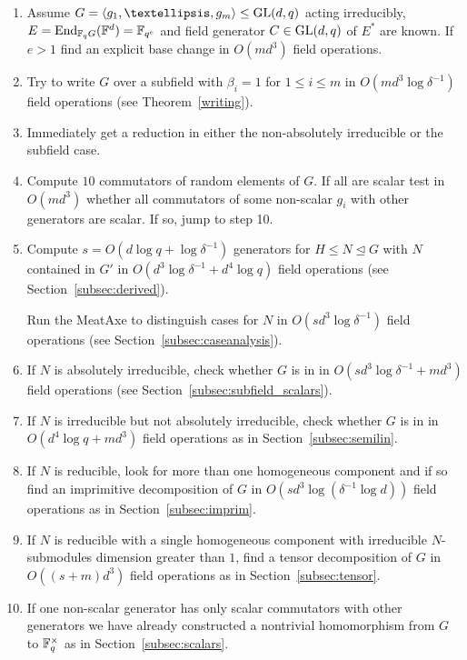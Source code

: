 \begin{enumerate}
\item Assume $G = \left< g_1, \ldots, g_m \right> \le \GL(d,q)$ acting
irreducibly, $E = \End_{\F_q G}(\F^d) = \F_{q^e}$ and
field generator $C \in \GL(d,q)$ of $E^\ast$ are known. If $e > 1$ find an explicit
base change in $O(md^3)$ field operations.
\item Try to write $G$ over a subfield with $\beta_i = 1$ for $1 \leq i \leq m$ 
in $O(md^3\log \delta^{-1})$ field operations
(see Theorem~\ref{writing}).
\item Immediately get a reduction in either the non-absolutely irreducible
or the subfield case.
\item Compute $10$ commutators of random elements of $G$. If all are
scalar test in $O(md^3)$ whether all commutators of some non-scalar
$g_i$ with other generators are scalar. If so, jump to step 10.
\item Compute $s = O(d\log q + \log \delta^{-1})$ generators for 
    $H \le N \unlhd G$ with $N$ contained in $G'$ in 
    $O(d^3\log \delta^{-1} + d^4 \log q)$ field operations
    (see Section~\ref{subsec:derived}). 

Run the MeatAxe to distinguish cases for $N$ in 
$O(sd^3 \log \delta^{-1})$ field operations
(see Section~\ref{subsec:caseanalysis}).
\item If $N$ is absolutely irreducible, check whether $G$ is in 
in $O(sd^3\log \delta^{-1} + md^3)$ field operations
(see Section~\ref{subsec:subfield_scalars}).
\item If $N$ is irreducible but not absolutely irreducible, check
whether $G$ is in  in $O(d^4\log q +m d^3)$ field operations
    as in Section~\ref{subsec:semilin}.
\item If $N$ is reducible, look for more than one 
homogeneous component and if so find an imprimitive 
decomposition of $G$ in $O(sd^3\log( \delta^{-1} \log d))$ field operations as in
Section~\ref{subsec:imprim}.
\item If $N$ is reducible with a single 
homogeneous component with irreducible $N$-submodules 
dimension greater than $1$, find a tensor
decomposition of $G$ in $O((s+m)d^3)$ field operations as in 
Section~\ref{subsec:tensor}.
\item If one non-scalar 
generator has only scalar commutators with other generators we have 
already constructed
a nontrivial homomorphism from $G$ to $\mathbb{F}_q^\times$
 as in
Section~\ref{subsec:scalars}.
\end{enumerate}

